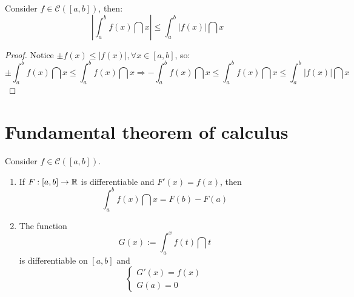 \begin{theorem}
    Consider $f \in \mathcal{C}([a,b])$, then:
    \begin{equation*}
        \left |
            \int_a^b f(x) \dint x
        \right | \leq
        \int_a^b |f(x)| \dint x
    \end{equation*}
\end{theorem}

\begin{proof}
    Notice $\pm f(x) \leq |f(x)|, \forall x \in [a,b]$, so:
    \begin{equation*}
        \pm \int_a^b f(x) \dint x \leq \int_a^b f(x) \dint x \Longrightarrow -\int_a^b f(x) \dint x \leq \int_a^b f(x) \dint x \leq \int_a^b |f(x)| \dint x 
    \end{equation*}
\end{proof}

\section{Fundamental theorem of calculus}

\begin{theorem}
    Consider $f \in \mathcal{C}([a,b])$.
    \begin{enumerate}
        \item If $F:[a,b] \to \mathbb{R}$ is differentiable and $F'(x) = f(x)$, then
            \begin{equation*}
                \int_a^b f(x) \dint x = F(b) - F(a)
            \end{equation*}
        \item The function 
            \begin{equation*}
                G(x) := \int_a^x f(t) \dint t
            \end{equation*}
            is differentiable on $[a,b]$ and
            \begin{equation*}
                \begin{cases}
                    G'(x) = f(x) \\
                    G(a) = 0
                \end{cases}
            \end{equation*} 
    \end{enumerate}
\end{theorem}

